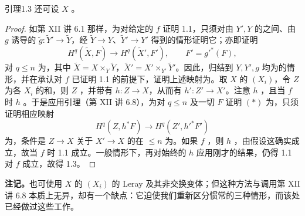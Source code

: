 \begin{SGAresult}{引理}{1.3}
还可设 $X$ 。
\end{SGAresult}
\begin{proof}
如第 XII 讲 6.1 那样，为对给定的 $f$ 证明 1.1，只须对由 $Y',Y$ 的之间、由 $g$ 诱导的 $\widetilde g:\widetilde Y'\to\widetilde Y$，经 $\widetilde Y\to Y$、$\widetilde Y'\to Y'$ 得到的情形证明它；亦即证明
\[
H^q(\widetilde X,F)\longrightarrow H^q(\widetilde X',F'),\qquad F'=g'^*(F),\tag{*}
\]
对 $q\leq n$ 为，其中 $\widetilde X=X\times_Y\widetilde Y$，$\widetilde X'=X'\times_{Y'}\widetilde Y'$。因此，归结到 $Y,Y',g$ 均为的情形，并在承认对 $f$ 已证明 1.1 的前提下，证明上述映射为。取 $X$ 的 $(X_i)$，令 $Z$ 为各 $X_i$ 的和，则 $Z$ ，并带有 $h:Z\to X$，从而有 $h':Z'\to X'$。注意 $h$ ，且当 $f$ 时 $h$ 。于是应用引理（第 XII 讲 6.8），为对 $q\leq n$ 及一切 $F$ 证明 $(*)$ 为，只须证明相应映射
\[
H^q(Z,h^*F)\longrightarrow H^q(Z',h'^*F')
\]
为，条件是 $Z\to X$ 关于 $X'\to X$ 的在 $\leq n$ 为。如果 $f$ ，则 $h$ ，由假设这确实成立，故当 $f$ 时 1.1 成立。一般情形下，再对始终的 $h$ 应用刚才的结果，仍得 1.1 对 $f$ 成立，故得 1.3。
\end{proof}
\textbf{注记。}也可使用 $X$ 的 $(X_i)$ 的 Leray 及其非交换变体；但这种方法与调用第 XII 讲 6.8 本质上无异，却有一个缺点：它迫使我们重新区分惯常的三种情形，而该处已经做过这些工作。

